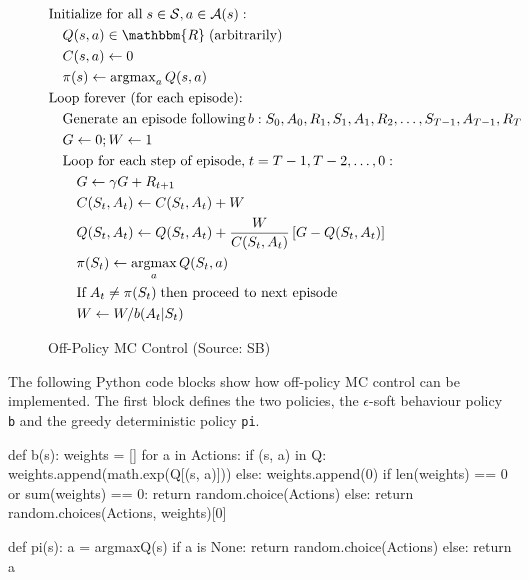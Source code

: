 \begin{figure}
\small
\begin{pseudocodebox}
\vspace{-\baselineskip}
\begin{align*}
& \text{Initialize for all}\; s \in \mathcal{S}, a \in \mathcal{A}(s):\\
& \quad Q(s,a) \in \mathbbm{R}\; \text{(arbitrarily)} \\
& \quad C(s, a) \leftarrow 0 \\
& \quad \pi(s) \leftarrow \operatorname{arg max}_a Q(s, a) \\
& \text{Loop forever (for each episode):} \\
& \quad \text{Generate an episode following}\, b: S_0, A_0, R_1, S_1, A_1, R_2, \ldots, S_{T-1}, A_{T-1}, R_{T} \\
& \quad G \leftarrow 0; W \leftarrow 1 \\
& \quad \text{Loop for each step of episode,}\; t = T-1, T-2, \ldots, 0: \\
& \quad \quad G \leftarrow \gamma G + R_{t+1} \\
& \quad \quad C(S_t, A_t) \leftarrow C(S_t, A_t) + W \\
& \quad \quad Q(S_t, A_t) \leftarrow Q(S_t, A_t) + \frac{W}{C(S_t, A_t)} \left[ G - Q(S_t, A_t) \right] \\
& \quad \quad \pi(S_t) \leftarrow \operatorname*{arg max}_a Q(S_t, a) \\
& \quad \quad \text{If}\; A_t \neq \pi(S_t) \; \text{then proceed to next episode} \\
& \quad \quad W \leftarrow W / b(A_t | S_t)
\end{align*}
\end{pseudocodebox}
\caption[Off-Policy MC Control]{Off-Policy MC Control (Source: SB)}
\label{fig:offpolicymc}
\end{figure}

The following Python code blocks show how off-policy MC control can be implemented. The first block defines the two policies, the $\epsilon$-soft behaviour policy \texttt{b} and the greedy deterministic policy \texttt{pi}.

\begin{pythoncode}
def b(s):
    weights = []
    for a in Actions:
        if (s, a) in Q:
            weights.append(math.exp(Q[(s, a)]))
        else:
            weights.append(0)
    if len(weights) == 0 or sum(weights) == 0:
        return random.choice(Actions)
    else:
        return random.choices(Actions, weights)[0]

def pi(s):
    a = argmaxQ(s)
    if a is None:
        return random.choice(Actions)
    else:
        return a
\end{pythoncode}

